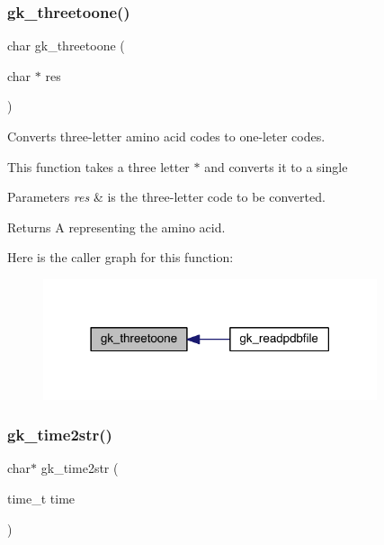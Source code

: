 \subsubsection{\texorpdfstring{gk\+\_\+threetoone()}{gk\_threetoone()}}
{\footnotesize\ttfamily char gk\+\_\+threetoone (\begin{DoxyParamCaption}\item[{char $\ast$}]{res }\end{DoxyParamCaption})}



Converts three-\/letter amino acid codes to one-\/leter codes. 

This function takes a three letter {\ttfamily $\ast$} and converts it to a single {\ttfamily } 


\begin{DoxyParams}{Parameters}
{\em res} & is the three-\/letter code to be converted. \\
\hline
\end{DoxyParams}
\begin{DoxyReturn}{Returns}
A {\ttfamily representing} the amino acid. 
\end{DoxyReturn}
Here is the caller graph for this function\+:\nopagebreak
\begin{figure}[H]
\begin{center}
\leavevmode
\includegraphics[width=278pt]{a00077_a6eb7d344c153ba6c0bbe608c18a4a2a1_icgraph}
\end{center}
\end{figure}
\mbox{\label{a00077_a79ca4ee9f715e6ce364af43f7f7a6cfc}} 
\subsubsection{\texorpdfstring{gk\+\_\+time2str()}{gk\_time2str()}}
{\footnotesize\ttfamily char$\ast$ gk\+\_\+time2str (\begin{DoxyParamCaption}\item[{time\+\_\+t}]{time }\end{DoxyParamCaption})}



